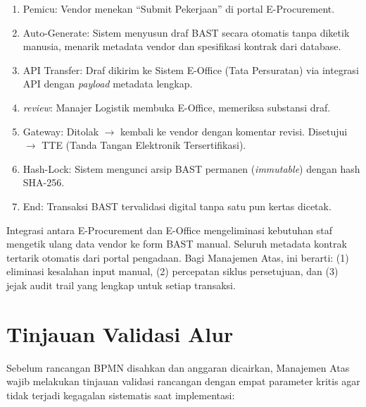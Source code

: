 \documentclass[12pt,a4paper]{report}
\begin{document}
\begin{enumerate}[leftmargin=*]
    \item Pemicu: Vendor menekan ``Submit Pekerjaan'' di portal E-Procurement.
    \item Auto-Generate: Sistem menyusun draf BAST secara otomatis tanpa diketik manusia, menarik metadata vendor dan spesifikasi kontrak dari database.
    \item API Transfer: Draf dikirim ke Sistem E-Office (Tata Persuratan) via integrasi API dengan \textit{payload} metadata lengkap.
    \item \textit{review}: Manajer Logistik membuka E-Office, memeriksa substansi draf.
    \item Gateway: Ditolak $\rightarrow$ kembali ke vendor dengan komentar revisi. Disetujui $\rightarrow$ TTE (Tanda Tangan Elektronik Tersertifikasi).
    \item Hash-Lock: Sistem mengunci arsip BAST permanen (\textit{immutable}) dengan hash SHA-256.
    \item End: Transaksi BAST tervalidasi digital tanpa satu pun kertas dicetak.
\end{enumerate}

\begin{plnbox}
Integrasi antara E-Procurement dan E-Office mengeliminasi kebutuhan staf mengetik ulang data vendor ke form BAST manual. Seluruh metadata kontrak tertarik otomatis dari portal pengadaan. Bagi Manajemen Atas, ini berarti: (1) eliminasi kesalahan input manual, (2) percepatan siklus persetujuan, dan (3) jejak audit trail yang lengkap untuk setiap transaksi.
\end{plnbox}


\section{Tinjauan Validasi Alur}
Sebelum rancangan BPMN disahkan dan anggaran dicairkan, Manajemen Atas wajib melakukan tinjauan validasi rancangan dengan empat parameter kritis agar tidak terjadi kegagalan sistematis saat implementasi:
\end{document}
